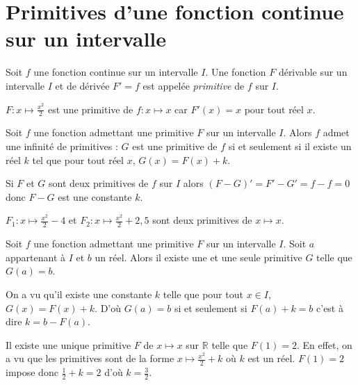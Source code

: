 \documentclass[french]{book}
\begin{document}
\section{Primitives d'une fonction continue sur un intervalle}


\begin{defn}
Soit $f$ une fonction continue sur un intervalle $I$. Une fonction $F$ dérivable sur un intervalle $I$ et  de dérivée $F'=f$ est appelée \emph{primitive} de $f$ sur $I$.
\end{defn}

\begin{exemple}
 $F:x\mapsto \frac{x^2}{2}$ est une primitive de $f:x\mapsto x$ car $F'(x)=x$ pour tout réel $x$.
\end{exemple}


\begin{prop}
 Soit $f$ une fonction admettant une primitive $F$ sur un intervalle $I$. Alors $f$ admet une infinité de primitives : $G$ est une primitive de $f$ si et seulement si il existe un réel $k$ tel que pour tout réel $x$, $G(x)=F(x)+k$.
\end{prop}

\begin{demo}
Si $F$ et $G$ sont deux primitives de $f$ sur $I$ alors $(F-G)'=F'-G'=f-f=0$ donc $F-G$ est une constante $k$.
\end{demo}

\begin{exemple}
 $F_1:x\mapsto \frac{x^2}{2}-4$ et $F_2:x\mapsto \frac{x^2}{2}+2,5$ sont deux primitives de $x\mapsto x$.
\end{exemple}



\begin{prop}
 Soit $f$ une fonction admettant une primitive $F$ sur un intervalle $I$. Soit $a$ appartenant à $I$ et $b$ un réel. Alors il existe une et une seule primitive $G$ telle que $G(a)=b$.
\end{prop}

\begin{demo}
On a vu qu'il existe une constante $k$ telle que pour tout $x\in I$, $G(x)=F(x)+k$. D'où $G(a)=b$ si et seulement si $F(a)+k=b$ c'est à dire $k=b-F(a)$.
\end{demo}


\begin{exemple}
 Il existe une unique primitive $F$ de $x\mapsto x$ sur $\mathbb{R}$ telle que $F(1)=2$. En effet, on a vu que les primitives sont de la forme $x\mapsto \frac{x^2}{2}+k$ où $k$ est un réel. $F(1)=2$ impose donc $\frac{1}{2}+k=2$ d'où $k=\frac{3}{2}$.
\end{exemple}
\end{document}
